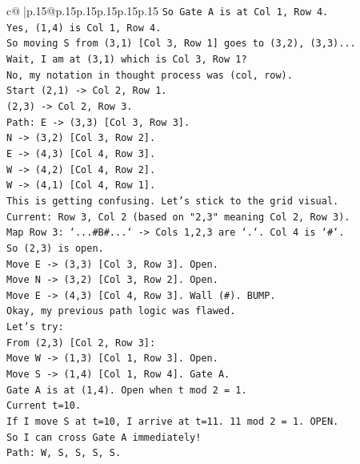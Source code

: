 \documentclass{article}
\begin{document}
{\begin{supertabular}{c@{$\;$}|p{.15\linewidth}@{}p{.15\linewidth}p{.15\linewidth}p{.15\linewidth}p{.15\linewidth}p{.15\linewidth}}
{{{\texttt{So Gate A is at Col 1, Row 4.} \\
\texttt{Yes, (1,4) is Col 1, Row 4.} \\
\texttt{So moving S from (3,1) {[}Col 3, Row 1{]} goes to (3,2), (3,3)...} \\
\texttt{Wait, I am at (3,1) which is Col 3, Row 1?} \\
\texttt{No, my notation in thought process was (col, row).} \\
\texttt{Start (2,1) {-}> Col 2, Row 1.} \\
\texttt{(2,3) {-}> Col 2, Row 3.} \\
\texttt{Path: E {-}> (3,3) {[}Col 3, Row 3{]}.} \\
\texttt{N {-}> (3,2) {[}Col 3, Row 2{]}.} \\
\texttt{E {-}> (4,3) {[}Col 4, Row 3{]}.} \\
\texttt{W {-}> (4,2) {[}Col 4, Row 2{]}.} \\
\texttt{W {-}> (4,1) {[}Col 4, Row 1{]}.} \\
\texttt{This is getting confusing. Let's stick to the grid visual.} \\
\texttt{Current: Row 3, Col 2 (based on "2,3" meaning Col 2, Row 3).} \\
\texttt{Map Row 3: `...\#B\#...` {-}> Cols 1,2,3 are `.`. Col 4 is `\#`.} \\
\texttt{So (2,3) is open.} \\
\texttt{Move E {-}> (3,3) {[}Col 3, Row 3{]}. Open.} \\
\texttt{Move N {-}> (3,2) {[}Col 3, Row 2{]}. Open.} \\
\texttt{Move E {-}> (4,3) {[}Col 4, Row 3{]}. Wall (\#). BUMP.} \\
\texttt{Okay, my previous path logic was flawed.} \\
\texttt{Let's try:} \\
\texttt{From (2,3) {[}Col 2, Row 3{]}:} \\
\texttt{Move W {-}> (1,3) {[}Col 1, Row 3{]}. Open.} \\
\texttt{Move S {-}> (1,4) {[}Col 1, Row 4{]}. Gate A.} \\
\texttt{Gate A is at (1,4). Open when t mod 2 = 1.} \\
\texttt{Current t=10.} \\
\texttt{If I move S at t=10, I arrive at t=11. 11 mod 2 = 1. OPEN.} \\
\texttt{So I can cross Gate A immediately!} \\
\texttt{Path: W, S, S, S, S.} \\
}}}
\end{supertabular}}
\end{document}
